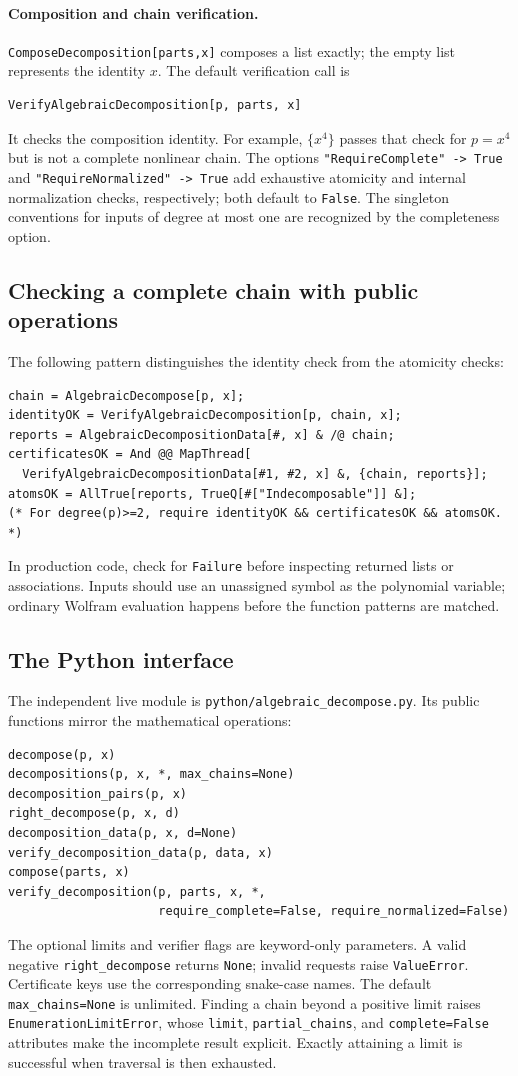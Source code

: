 \documentclass[11pt,a4paper]{article}
\numberwithin{equation}{section}
\theoremstyle{definition}
\theoremstyle{remark}
\newcommand{\code}[1]{\texttt{#1}}
\begin{document}
\paragraph{Composition and chain verification.}
\code{ComposeDecomposition[parts,x]} composes a list exactly; the empty list
represents the identity $x$.
The default verification call is
\begin{lstlisting}
VerifyAlgebraicDecomposition[p, parts, x]
\end{lstlisting}
It checks the composition identity. For example, $\{x^4\}$ passes that check for $p=x^4$ but
is not a complete nonlinear chain. The options
\code{"RequireComplete" -> True} and \code{"RequireNormalized" -> True}
add exhaustive atomicity and internal normalization checks, respectively;
both default to \code{False}. The singleton conventions for inputs of degree
at most one are recognized by the completeness option.

\subsection{Checking a complete chain with public operations}
The following pattern distinguishes the identity check from the atomicity
checks:
\begin{lstlisting}
chain = AlgebraicDecompose[p, x];
identityOK = VerifyAlgebraicDecomposition[p, chain, x];
reports = AlgebraicDecompositionData[#, x] & /@ chain;
certificatesOK = And @@ MapThread[
  VerifyAlgebraicDecompositionData[#1, #2, x] &, {chain, reports}];
atomsOK = AllTrue[reports, TrueQ[#["Indecomposable"]] &];
(* For degree(p)>=2, require identityOK && certificatesOK && atomsOK. *)
\end{lstlisting}
In production code, check for \code{Failure} before inspecting returned lists
or associations. Inputs should use an unassigned symbol as the polynomial
variable; ordinary Wolfram evaluation happens before the function patterns
are matched.

\subsection{The Python interface}
The independent live module is \code{python/algebraic\_decompose.py}.
Its public functions mirror the mathematical operations:
\begin{lstlisting}
decompose(p, x)
decompositions(p, x, *, max_chains=None)
decomposition_pairs(p, x)
right_decompose(p, x, d)
decomposition_data(p, x, d=None)
verify_decomposition_data(p, data, x)
compose(parts, x)
verify_decomposition(p, parts, x, *,
                     require_complete=False, require_normalized=False)
\end{lstlisting}
The optional limits and verifier flags are keyword-only parameters.
A valid negative \code{right\_decompose} returns \code{None}; invalid requests
raise \code{ValueError}. Certificate keys use the corresponding snake-case
names. The default \code{max\_chains=None} is unlimited. Finding a chain
beyond a positive limit raises \code{EnumerationLimitError}, whose
\code{limit}, \code{partial\_chains}, and \code{complete=False} attributes
make the incomplete result explicit. Exactly attaining a limit is successful
when traversal is then exhausted.
\end{document}
